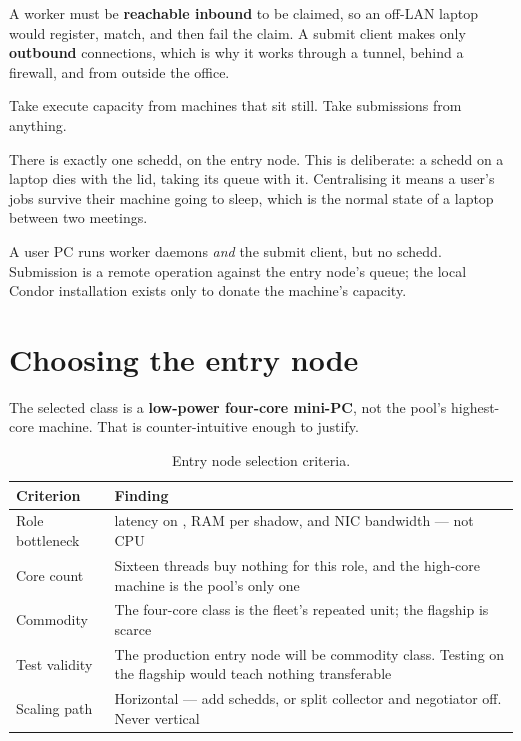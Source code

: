 A worker must be \textbf{reachable inbound} to be claimed, so an off-LAN laptop
would register, match, and then fail the claim. A submit client makes only
\textbf{outbound} connections, which is why it works through a tunnel, behind a
firewall, and from outside the office.

Take execute capacity from machines that sit still. Take submissions from
anything.

There is exactly one schedd, on the entry node. This is deliberate: a schedd on
a laptop dies with the lid, taking its queue with it. Centralising it means a
user's jobs survive their machine going to sleep, which is the normal state of a
laptop between two meetings.

\begin{keypoint}
A user PC runs worker daemons \emph{and} the submit client, but no schedd.
Submission is a remote operation against the entry node's queue; the local
Condor installation exists only to donate the machine's capacity.
\end{keypoint}

\section{Choosing the entry node}

The selected class is a \textbf{low-power four-core mini-PC}, not the pool's
highest-core machine. That is counter-intuitive enough to justify.

\begin{table}[H]
\centering
\begin{tabularx}{\textwidth}{L{0.22\textwidth} Y}
\toprule
\textbf{Criterion} & \textbf{Finding} \\
\midrule
Role bottleneck &  latency on , RAM per shadow, and NIC bandwidth --- not CPU \\
Core count & Sixteen threads buy nothing for this role, and the high-core machine is the pool's only one \\
Commodity & The four-core class is the fleet's repeated unit; the flagship is scarce \\
Test validity & The production entry node will be commodity class. Testing on the flagship would teach nothing transferable \\
Scaling path & Horizontal --- add schedds, or split collector and negotiator off. Never vertical \\
\bottomrule
\end{tabularx}
\caption{Entry node selection criteria.}
\end{table}

